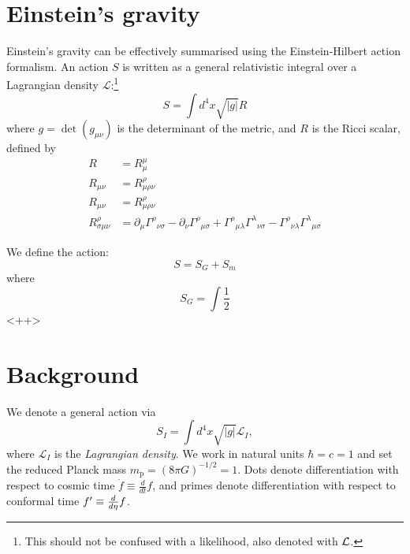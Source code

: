 \section{Einstein's gravity}
\label{sec:cos:einsteins_gravity}

Einstein's gravity can be effectively summarised using the Einstein-Hilbert action formalism. An action $S$ is written as a general relativistic integral over a Lagrangian density $\mathcal{L}$:\footnote{This should not be confused with a likelihood, also denoted with $\mathcal{L}$.}
\begin{equation}
  S = \int d^4 x \sqrt{|g|} R
  \label{eqn:cos:action}
\end{equation}
where $g=\det(g_{\mu\nu})$ is the determinant of the metric, and $R$ is the Ricci scalar, defined by
\begin{align}
  R &= R^\mu_\mu \label{eqn:cos:ricci_scalar_def} \\
  R_{\mu\nu} &= R^\rho_{\mu\rho\nu} \label{eqn:cos:ricci_tensor_def} \\
  R_{\mu\nu} &= R^\rho_{\mu\rho\nu} \label{eqn:cos:riemann_tensor_def} \\
  R^\rho_{\sigma\mu\nu} &= \partial_\mu\Gamma^\rho{}_{\nu\sigma}
    - \partial_\nu\Gamma^\rho{}_{\mu\sigma}
    + \Gamma^\rho{}_{\mu\lambda}\Gamma^\lambda{}_{\nu\sigma}
    - \Gamma^\rho{}_{\nu\lambda}\Gamma^\lambda{}_{\mu\sigma}
\end{align}

We define the action:
\begin{equation}
  S = S_G + S_m
  \label{eqn:cos:action}
\end{equation}
where
\begin{equation}
  S_G = \int \frac{1}{2}
  \label{<++>}
\end{equation}<++>

\section{Background}
\label{sec:background}

\clearpage{}

We denote a general action via
\begin{equation}
  S_I = \int d^4x\sqrt{|g|}\mathcal{L}_I,
  \label{eqn:general_action}
\end{equation}
where $\mathcal{L}_I$ is the {\em Lagrangian density}. We work in natural units $\hbar=c=1$ and set the reduced Planck mass $m_\mathrm{p} = {(8\pi G)}^{-1/2} = 1$. Dots denote differentiation with respect to cosmic time $\dot{f}\equiv \frac{d}{dt}f$, and primes denote differentiation with respect to conformal time ${{f}^\prime}\equiv\frac{d}{d\eta}f$.

